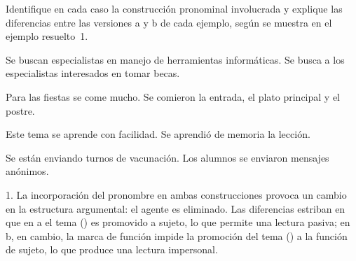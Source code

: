 \begin{ejercicio}\label{ej:10-diferencias}
Identifique en cada caso la construcción pronominal involucrada y explique las
diferencias entre las versiones a y b de cada ejemplo, según se muestra en el
ejemplo resuelto~1.

\begin{exe}
  \ex
    \begin{xlist}
      \ex Se buscan especialistas en manejo de herramientas informáticas.
      \ex Se busca a los especialistas interesados en tomar becas.
    \end{xlist}
  \ex
    \begin{xlist}
      \ex Para las fiestas se come mucho.
      \ex Se comieron la entrada, el plato principal y el postre.
    \end{xlist}
  \ex
    \begin{xlist}
      \ex Este tema se aprende con facilidad.
      \ex Se aprendió de memoria la lección.
    \end{xlist}
  \ex
    \begin{xlist}
      \ex Se están enviando turnos de vacunación.
      \ex Los alumnos se enviaron mensajes anónimos.
    \end{xlist}
\end{exe}

\begin{resuelto}
1. La incorporación del pronombre  en ambas construcciones provoca un
cambio en la estructura argumental: el agente es eliminado. Las diferencias
estriban en que en a el tema () es promovido a
sujeto, lo que permite una lectura pasiva; en b, en cambio, la marca de función
 impide la promoción del tema () a la función de sujeto, lo que produce una lectura
impersonal.
\end{resuelto}
\end{ejercicio}

